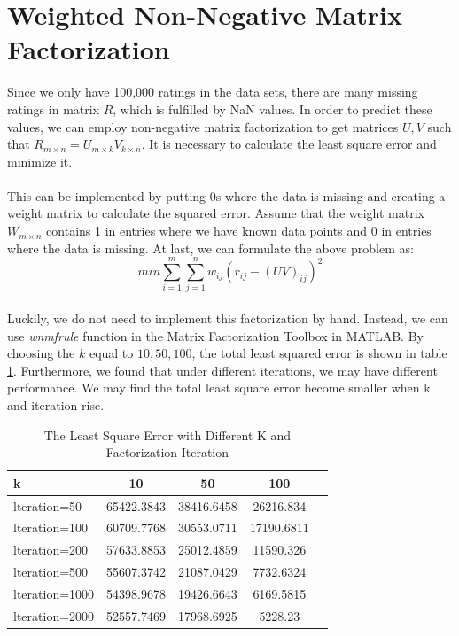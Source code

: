 \documentclass{article}
\begin{document}
\section{Weighted Non-Negative Matrix Factorization}
Since we only have 100,000 ratings in the data sets, there are many missing ratings in matrix $R$, which is fulfilled by NaN values. In order to predict these values, we can employ non-negative matrix factorization to get matrices $U, V$ such that $R_{m \times n}=U_{m \times k}V_{k \times n}$. It is necessary to calculate the least square error and minimize it.\\
\\
This can be implemented by putting 0s where the data is missing and creating a weight matrix to calculate the squared error. Assume that the weight matrix $W_{m \times n}$ contains 1 in entries where we have known data points and 0 in entries where the data is missing. At last, we can formulate the above problem as:
\begin{equation*}
min\sum_{i=1}^{m}\sum_{j=1}^{n}w_{ij}{(r_{ij}-{(UV)}_{ij})}^2
\end{equation*}
\\
Luckily, we do not need to implement this factorization by hand. Instead, we can use \emph{wnmfrule} function in the Matrix Factorization Toolbox in MATLAB. By choosing the $k$ equal to $10, 50, 100$, the total least squared error is shown in table \ref{tb:k}. Furthermore, we found that under different iterations, we may have different performance. We may find the total least square error become smaller when k and iteration rise.
\begin{table}
\begin{center}
\caption{The Least Square Error with Different K and Factorization Iteration}
\label{tb:k}
\begin{tabular}{|l||c|c|c|c|}
\hline
k& 10& 50 & 100\\
\hline
lteration=50&65422.3843&38416.6458&26216.834\\
lteration=100&60709.7768&30553.0711&17190.6811\\
lteration=200&57633.8853&25012.4859&11590.326\\
lteration=500&55607.3742&21087.0429&7732.6324\\
lteration=1000&54398.9678&19426.6643&6169.5815\\
lteration=2000&52557.7469&17968.6925&5228.23\\
\hline
\end{tabular}
\end{center}
\end{table}
\end{document}
